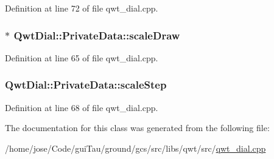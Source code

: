 Definition at line 72 of file qwt\-\_\-dial.\-cpp.

\hypertarget{class_qwt_dial_1_1_private_data_aa278967e3cf870d4c2a4003b6be2b8a4}{
\subsubsection[{scale\-Draw}]{$\ast$ Qwt\-Dial\-::\-Private\-Data\-::scale\-Draw}}\label{class_qwt_dial_1_1_private_data_aa278967e3cf870d4c2a4003b6be2b8a4}


Definition at line 65 of file qwt\-\_\-dial.\-cpp.

\hypertarget{class_qwt_dial_1_1_private_data_a53849422991fb7496572474f5e7fe6a2}{
\subsubsection[{scale\-Step}]{ Qwt\-Dial\-::\-Private\-Data\-::scale\-Step}}\label{class_qwt_dial_1_1_private_data_a53849422991fb7496572474f5e7fe6a2}


Definition at line 68 of file qwt\-\_\-dial.\-cpp.



The documentation for this class was generated from the following file\-:\begin{DoxyCompactItemize}
\item 
/home/jose/\-Code/gui\-Tau/ground/gcs/src/libs/qwt/src/\hyperlink{qwt__dial_8cpp}{qwt\-\_\-dial.\-cpp}\end{DoxyCompactItemize}
